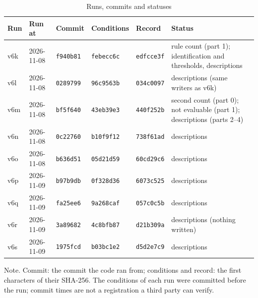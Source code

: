 \begin{table}[htbp]
\caption{Runs, commits and statuses}
\label{tab:runs}
\footnotesize
\begin{tabularx}{\linewidth}{@{}lllllX@{}}
\toprule
Run & Run at & Commit & Conditions & Record & Status \\
\midrule
v6k & 2026-11-08 & \texttt{f940b81} & \texttt{febecc6c} & \texttt{edfcce3f} & rule count (part 1); identification and thresholds, descriptions \\
v6l & 2026-11-08 & \texttt{0289799} & \texttt{96c9563b} & \texttt{034c0097} & descriptions (same writers as v6k) \\
v6m & 2026-11-08 & \texttt{bf5f640} & \texttt{43eb39e3} & \texttt{440f252b} & second count (part 0); not evaluable (part 1); descriptions (parts 2--4) \\
v6n & 2026-11-08 & \texttt{0c22760} & \texttt{b10f9f12} & \texttt{738f61ad} & descriptions \\
v6o & 2026-11-08 & \texttt{b636d51} & \texttt{05d21d59} & \texttt{60cd29c6} & descriptions \\
v6p & 2026-11-09 & \texttt{b97b9db} & \texttt{0f328d36} & \texttt{6073c525} & descriptions \\
v6q & 2026-11-09 & \texttt{fa25ee6} & \texttt{9a268caf} & \texttt{057c0c5b} & descriptions \\
v6r & 2026-11-09 & \texttt{3a89682} & \texttt{4c8bfb87} & \texttt{d21b309a} & descriptions (nothing written) \\
v6s & 2026-11-09 & \texttt{1975fcd} & \texttt{b03bc1e2} & \texttt{d5d2e7c9} & descriptions \\
\bottomrule
\end{tabularx}
\par\smallskip\footnotesize Note. Commit: the commit the code ran from; conditions and record: the first characters of their SHA-256. The conditions of each run were committed before the run; commit times are not a registration a third party can verify.
\end{table}
